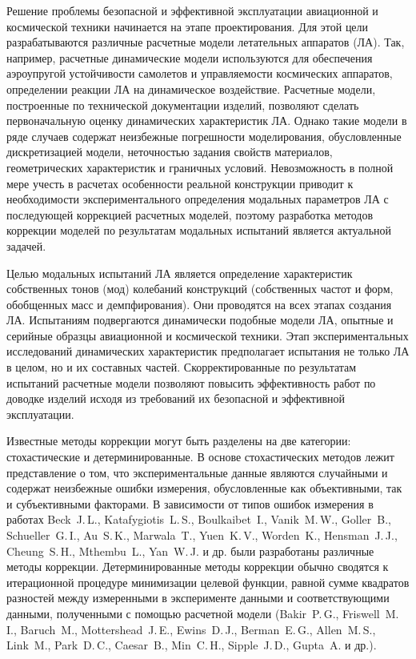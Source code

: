 
{\actuality} 

Решение проблемы безопасной и эффективной эксплуатации авиационной и космической техники начинается на этапе проектирования. Для этой цели разрабатываются различные расчетные модели летательных аппаратов (ЛА). Так, например, расчетные динамические модели используются для обеспечения аэроупругой устойчивости самолетов и управляемости космических аппаратов, определении реакции ЛА на динамическое воздействие. Расчетные модели, построенные по технической документации изделий, позволяют сделать первоначальную оценку динамических характеристик ЛА. Однако такие модели в ряде случаев содержат неизбежные погрешности моделирования, обусловленные дискретизацией модели, неточностью задания свойств материалов, геометрических характеристик и граничных условий. Невозможность в полной мере учесть в расчетах особенности реальной конструкции приводит к необходимости экспериментального определения модальных параметров ЛА с последующей коррекцией расчетных моделей, поэтому разработка методов коррекции моделей по результатам модальных испытаний является актуальной задачей.

Целью модальных испытаний ЛА является определение характеристик собственных тонов (мод) колебаний конструкций (собственных частот и форм, обобщенных масс и демпфирования). Они проводятся на всех этапах создания ЛА. Испытаниям подвергаются динамически подобные модели ЛА, опытные и серийные образцы авиационной и космической техники. Этап экспериментальных исследований динамических характеристик предполагает испытания не только ЛА в целом, но и их составных частей. Скорректированные по результатам испытаний расчетные модели позволяют повысить эффективность работ по доводке изделий исходя из требований их безопасной и эффективной эксплуатации. 

{\progress}

Известные методы коррекции могут быть разделены на две категории: стохастические и детерминированные. В основе стохастических методов лежит представление о том, что экспериментальные данные являются случайными и содержат неизбежные ошибки измерения, обусловленные как объективными, так и субъективными факторами. В зависимости от типов ошибок измерения в работах Beck~J.\,L., Katafygiotis~L.\,S., Boulkaibet~I., Vanik~M.\,W., Goller~B., Schueller~G.\,I., Au~S.\,K., Marwala~T., Yuen~K.\,V., Worden~K., Hensman~J.\,J., Cheung~S.\,H., Mthembu~L., Yan~W.\,J. и др. были разработаны различные методы коррекции. Детерминированные методы коррекции обычно сводятся к итерационной процедуре минимизации целевой функции, равной сумме квадратов разностей между измеренными в эксперименте данными и соответствующими данными, полученными с помощью расчетной модели (Bakir~P.\,G., Friswell~M.\,I., Baruch~M., Mottershead~J.\,E., Ewins~D.\,J., Berman~E.\,G., Allen~M.\,S., Link~M., Park~D.\,C., Caesar~B., Min~C.\,H., Sipple~J.\,D., Gupta~A. и др.).

